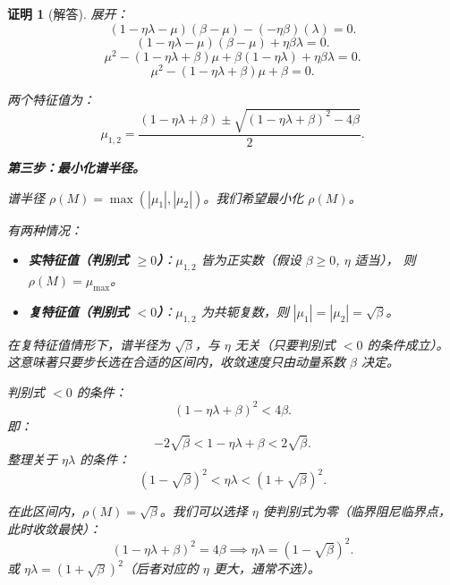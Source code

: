 \documentclass[12pt,a4paper]{ctexart}
\theoremstyle{definition}
\theoremstyle{plain}
\newtheorem*{proof*}{证明}
\begin{document}
\begin{proof*}[解答]
展开：
\begin{equation}
  (1 - \eta\lambda - \mu)(\beta - \mu) - (-\eta\beta)(\lambda) = 0.
\end{equation}
\begin{equation}
  (1 - \eta\lambda - \mu)(\beta - \mu) + \eta\beta\lambda = 0.
\end{equation}
\begin{equation}
  \mu^2 - (1 - \eta\lambda + \beta)\mu + \beta(1 - \eta\lambda) + \eta\beta\lambda = 0.
\end{equation}
\begin{equation}
  \mu^2 - (1 - \eta\lambda + \beta)\mu + \beta = 0.
\end{equation}

两个特征值为：
\begin{equation}
  \boxed{\mu_{1,2} = \frac{(1 - \eta\lambda + \beta) \pm \sqrt{(1 - \eta\lambda + \beta)^2 - 4\beta}}{2}.}
\end{equation}

\noindent\textbf{第三步：最小化谱半径。}

谱半径 $\rho(M) = \max(|\mu_1|, |\mu_2|)$。我们希望最小化 $\rho(M)$。

有两种情况：

\begin{itemize}
  \item \textbf{实特征值（判别式 $\ge 0$）}：$\mu_{1,2}$ 皆为正实数（假设 $\beta \ge 0$, $\eta$ 适当），
    则 $\rho(M) = \mu_{\max}$。
  \item \textbf{复特征值（判别式 $< 0$）}：$\mu_{1,2}$ 为共轭复数，则 $|\mu_1| = |\mu_2| = \sqrt{\beta}$。
\end{itemize}

在复特征值情形下，谱半径为 $\sqrt{\beta}$，与 $\eta$ 无关（只要判别式 $<0$ 的条件成立）。
这意味著只要步长选在合适的区间内，收敛速度只由动量系数 $\beta$ 决定。

判别式 $< 0$ 的条件：
\begin{equation}
  (1 - \eta\lambda + \beta)^2 < 4\beta.
\end{equation}
即：
\begin{equation}
  -2\sqrt{\beta} < 1 - \eta\lambda + \beta < 2\sqrt{\beta}.
\end{equation}
整理关于 $\eta\lambda$ 的条件：
\begin{equation}
  (1 - \sqrt{\beta})^2 < \eta\lambda < (1 + \sqrt{\beta})^2.
\end{equation}

在此区间内，$\rho(M) = \sqrt{\beta}$。我们可以选择 $\eta$ 使判别式为零（临界阻尼临界点，此时收敛最快）：
\begin{equation}
  (1 - \eta\lambda + \beta)^2 = 4\beta \implies \eta\lambda = (1 - \sqrt{\beta})^2.
\end{equation}
或 $\eta\lambda = (1 + \sqrt{\beta})^2$（后者对应的 $\eta$ 更大，通常不选）。


\end{proof*}
\end{document}
